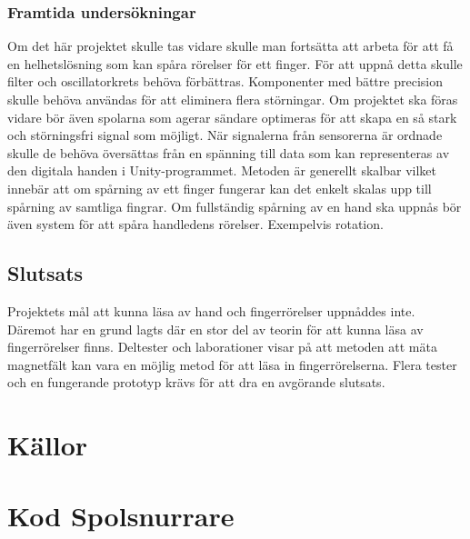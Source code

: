 \documentclass[a4paper]{article}
\makeatletter
\let\\\@raggedtwoe@savedcr%
\makeatother
\begin{document}
\begin{sloppypar}
    \subsubsection{Framtida undersökningar}
    Om det här projektet skulle tas vidare skulle man fortsätta att arbeta för att få en helhetslösning som kan spåra
    rörelser för ett finger. För att uppnå detta skulle filter och oscillatorkrets behöva förbättras. Komponenter med
    bättre precision skulle behöva användas för att eliminera flera störningar. Om projektet ska föras vidare bör även
    spolarna som agerar sändare optimeras för att skapa en så stark och störningsfri signal som möjligt.
    \\\\
    När signalerna från sensorerna är ordnade skulle de behöva översättas från en spänning till data som kan representeras
    av den digitala handen i Unity-programmet. Metoden är generellt skalbar vilket innebär att om spårning av ett finger
    fungerar kan det enkelt skalas upp till spårning av samtliga fingrar. Om fullständig spårning av en hand ska uppnås bör
    även system för att spåra handledens rörelser. Exempelvis rotation.
    \subsection{Slutsats}
    Projektets mål att kunna läsa av hand och fingerrörelser uppnåddes inte. Däremot har en grund lagts där en stor del av
    teorin för att kunna läsa av fingerrörelser finns. Deltester och laborationer visar på att metoden att mäta magnetfält
    kan vara en möjlig metod för att läsa in fingerrörelserna. Flera tester och en fungerande prototyp krävs för att dra
    en avgörande slutsats.


    \newpage

    \section{Källor}
    \printbibliography[heading=none]

    \newpage
    \appendices
    \titleformat{\section}[display]
    {\normalfont\Large\bfseries}{\appendixname\enspace\thesection}{.5em}{} %



    \section{Kod Spolsnurrare}
    \label{bilaga:Kod_Spolsnurrare}
    \inputminted[breaklines]{cpp}{./Code/Spolsnurrare.cpp}


\end{sloppypar}
\end{document}
